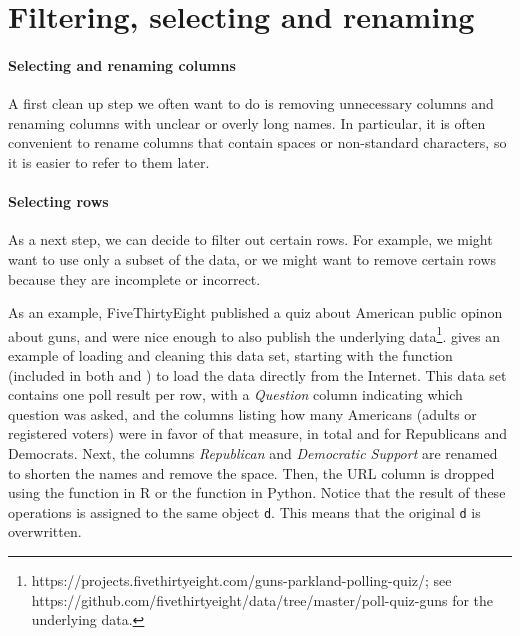 \section{Filtering, selecting and renaming}


\paragraph{Selecting and renaming columns}
A first clean up step we often want to do is removing unnecessary columns and renaming columns with unclear or overly long names.
In particular, it is often convenient to rename columns that contain spaces or non-standard characters, so it is easier to refer to them later.

\paragraph{Selecting rows}
As a next step, we can decide to filter out certain rows.
For example, we might want to use only a subset of the data,
or we might want to remove certain rows because they are incomplete or incorrect.

As an example, FiveThirtyEight published a quiz about American public opinon about guns,
and were nice enough to also publish the underlying data\footnote{https://projects.fivethirtyeight.com/guns-parkland-polling-quiz/; see https://github.com/fivethirtyeight/data/tree/master/poll-quiz-guns for the underlying data.}.
 gives an example of loading and cleaning this data set, starting with the function  (included in both  and ) to load the data directly from the Internet.
This data set contains one poll result per row, with a \emph{Question} column indicating which question was asked,
and the columns listing how many Americans (adults or registered voters) were in favor of that measure, in total and for Republicans and Democrats.
Next, the columns \emph{Republican} and \emph{Democratic Support} are renamed to shorten the names and remove the space.
Then, the URL column is dropped using the  function  in R or the  function  in Python.
Notice that the result of these operations is assigned to the same object \texttt{d}.
This means that the original \texttt{d} is overwritten.

  
